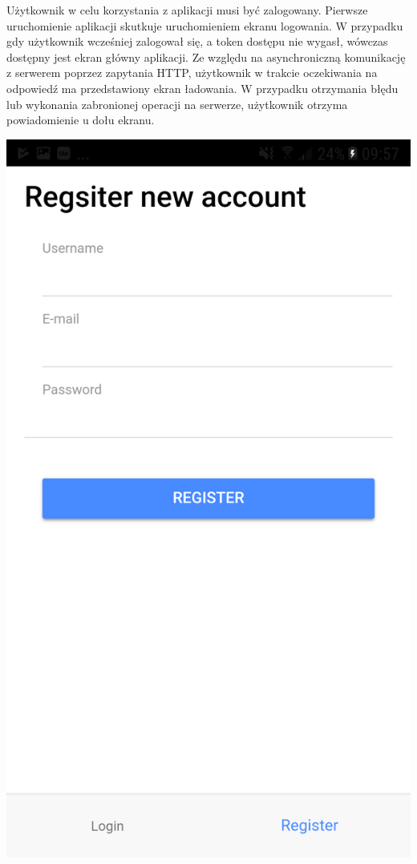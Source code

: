 \begin{minipage}{0.6\textwidth}
	Użytkownik w celu korzystania z aplikacji musi być zalogowany. Pierwsze uruchomienie aplikacji skutkuje uruchomieniem ekranu logowania. W przypadku gdy użytkownik wcześniej zalogował się, a token dostępu nie wygasł, wówczas dostępny jest ekran główny aplikacji. Ze względu na asynchroniczną komunikację z serwerem poprzez zapytania HTTP, użytkownik w trakcie oczekiwania na odpowiedź ma przedstawiony ekran ładowania. W przypadku otrzymania błędu lub wykonania zabronionej operacji na serwerze, użytkownik otrzyma powiadomienie u dołu ekranu.
	
\end{minipage}


\noindent\begin{minipage}{0.4\textwidth}\raggedleft
	\includegraphics[width=\linewidth]{"images/register_page"}
\end{minipage}
